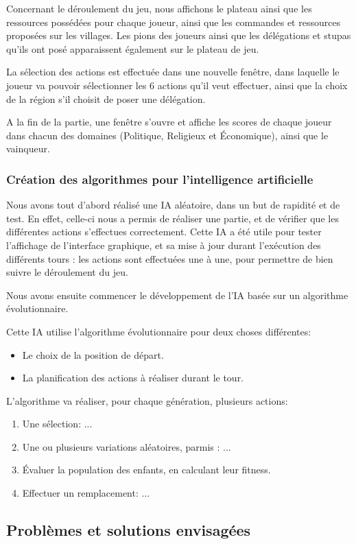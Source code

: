 		Concernant le déroulement du jeu, nous affichons le plateau ainsi que les ressources
		possédées pour chaque joueur, ainsi que les commandes et ressources proposées sur
		les villages. Les pions des joueurs ainsi que les délégations et stupas qu'ils ont posé
		apparaissent également sur le plateau de jeu.
		
		La sélection des actions est effectuée dans une nouvelle fenêtre, dans laquelle
		le joueur va pouvoir sélectionner les 6 actions qu'il veut effectuer, ainsi que
		la choix de la région s'il choisit de poser une délégation.
		
		A la fin de la partie, une fenêtre s'ouvre et affiche les scores de chaque joueur
		dans chacun des domaines (Politique, Religieux et Économique), ainsi que le vainqueur.
	
	\subsubsection{Création des algorithmes pour l'intelligence artificielle}
	
		Nous avons tout d'abord réalisé une IA aléatoire, dans un but de rapidité et de test.
		En effet, celle-ci nous a permis de réaliser une partie, et de vérifier que les différentes actions 
		s'effectues correctement.
		Cette IA a été utile pour tester l'affichage de l'interface graphique, et sa
		mise à jour durant l'exécution des différents tours : les actions sont effectuées une
		à une, pour permettre de bien suivre le déroulement du jeu.
		
		Nous avons ensuite commencer le développement de l'IA basée sur un algorithme évolutionnaire.
		
		
		Cette IA utilise l'algorithme évolutionnaire pour deux choses différentes:
		\begin{itemize}
			\item Le choix de la position de départ.
			\item La planification des actions à réaliser durant le tour.
		\end{itemize}
	
		
		
		L'algorithme va réaliser, pour chaque génération, plusieurs actions:
		\begin{enumerate}
			\item Une sélection: ...
			\item Une ou plusieurs variations aléatoires, parmis : ...
			\item Évaluer la population des enfants, en calculant leur fitness.
			\item Effectuer un remplacement: ...
		\end{enumerate}
				
\subsection{Problèmes et solutions envisagées}